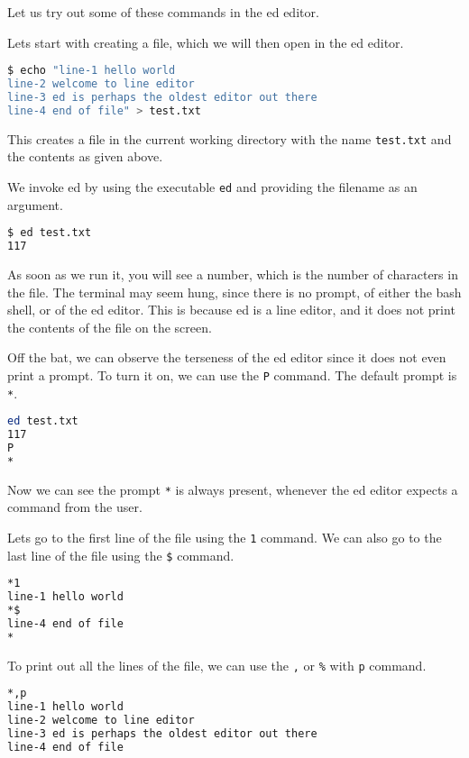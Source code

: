 Let us try out some of these commands in the ed editor.

Lets start with creating a file, which we will then open
in the ed editor.

\begin{lstlisting}[language=bash]
$ echo "line-1 hello world
line-2 welcome to line editor
line-3 ed is perhaps the oldest editor out there
line-4 end of file" > test.txt
\end{lstlisting}

This creates a file in the current working directory
with the name \texttt{test.txt} and the contents as
given above.

We invoke ed by using the executable \texttt{ed}
and providing the filename as an argument.

\begin{lstlisting}[language=bash]
$ ed test.txt
117
\end{lstlisting}

As soon as we run it, you will see a number,
which is the number of characters in the file.
The terminal may seem hung, since there is no
prompt, of either the bash shell, or of the ed editor.
This is because ed is a line editor, and it does not
print the contents of the file on the screen.

Off the bat, we can observe the terseness of the ed editor
since it does not even print a prompt.
To turn it on, we can use the \texttt{P} command.
The default prompt is \texttt{*}.

\begin{lstlisting}[language=bash]
ed test.txt
117
P
*
\end{lstlisting}

Now we can see the prompt \texttt{*} is always present,
whenever the ed editor expects a command from the user.

Lets go to the first line of the file using the \texttt{1} command.
We can also go to the last line of the file using the \texttt{\$} command.

\begin{lstlisting}[language=bash]
*1
line-1 hello world
*$
line-4 end of file
*
\end{lstlisting}

To print out all the lines of the file,
we can use the \texttt{,} or \texttt{\%} with \texttt{p} command.

\begin{lstlisting}[language=bash]
*,p
line-1 hello world
line-2 welcome to line editor
line-3 ed is perhaps the oldest editor out there
line-4 end of file
\end{lstlisting}

